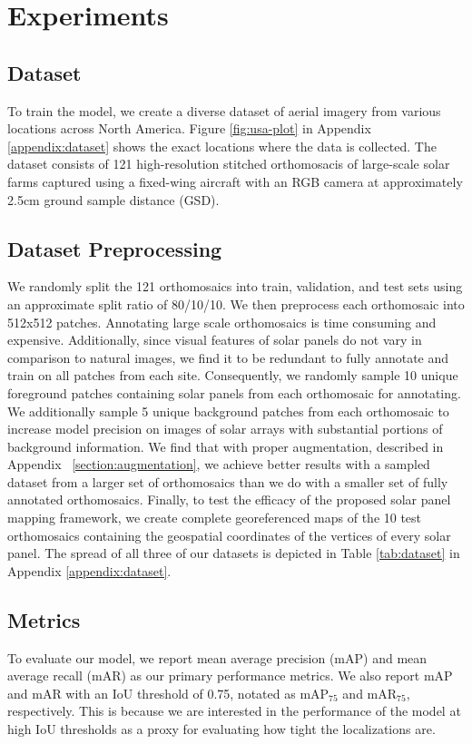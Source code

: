 

\section{Experiments}

\subsection{Dataset}

To train the model, we create a diverse dataset of aerial imagery from various locations across North America. Figure \ref{fig:usa-plot} in Appendix \ref{appendix:dataset} shows the exact locations where the data is collected. The dataset consists of 121 high-resolution stitched orthomosacis of large-scale solar farms captured using a fixed-wing aircraft with an RGB camera at approximately 2.5cm ground sample distance (GSD).

\subsection{Dataset Preprocessing}
We randomly split the 121 orthomosaics into train, validation, and test sets using an approximate split ratio of 80/10/10. We then preprocess each orthomosaic into 512x512 patches. Annotating large scale orthomosaics is time consuming and expensive. Additionally, since visual features of solar panels do not vary in comparison to natural images, we find it to be redundant to fully annotate and train on all patches from each site. Consequently, we randomly sample 10 unique foreground patches containing solar panels from each orthomosaic for annotating. We additionally sample 5 unique background patches from each orthomosaic to increase model precision on images of solar arrays with substantial portions of background information. We find that with proper augmentation, described in Appendix ~\ref{section:augmentation}, we achieve better results with a sampled dataset from a larger set of orthomosaics than we do with a smaller set of fully annotated orthomosaics. Finally, to test the efficacy of the proposed solar panel mapping framework, we create complete georeferenced maps of the 10 test orthomosaics containing the geospatial coordinates of the vertices of every solar panel. The spread of all three of our datasets is depicted in Table \ref{tab:dataset} in Appendix \ref{appendix:dataset}.

\subsection{Metrics}
To evaluate our model, we report mean average precision (mAP) and mean average recall (mAR) as our primary performance metrics. We also report mAP and mAR with an IoU threshold of 0.75, notated as $\text{mAP}_{75}$ and $\text{mAR}_{75}$, respectively. This is because we are interested in the performance of the model at high IoU thresholds as a proxy for evaluating how tight the localizations are.

